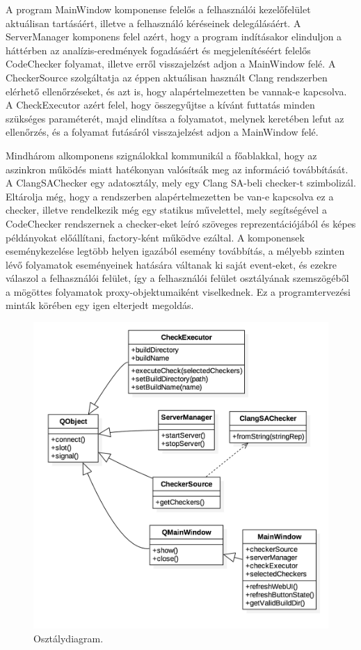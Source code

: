\documentclass[a4paper,12pt]{report}
\begin{document}
A program MainWindow komponense felelős a felhasználói kezelőfelület aktuálisan tartásáért, illetve a felhasználó kéréseinek delegálásáért. A ServerManager komponens felel azért, hogy a program indításakor elinduljon a háttérben az analízis-eredmények fogadásáért és megjelenítéséért felelős CodeChecker folyamat, illetve erről visszajelzést adjon a MainWindow felé. A CheckerSource szolgáltatja az éppen aktuálisan használt Clang rendszerben elérhető ellenőrzéseket, és azt is, hogy alapértelmezetten be vannak-e kapcsolva. A CheckExecutor azért felel, hogy összegyűjtse a kívánt futtatás minden szükséges paraméterét, majd elindítsa a folyamatot, melynek keretében lefut az ellenőrzés, és a folyamat futásáról visszajelzést adjon a MainWindow felé.

Mindhárom alkomponens szignálokkal kommunikál a főablakkal, hogy az aszinkron működés miatt hatékonyan valósítsák meg az információ továbbítását. A ClangSAChecker egy adatosztály, mely egy Clang SA-beli checker-t szimbolizál. Eltárolja még, hogy a rendszerben alapértelmezetten be van-e kapcsolva ez a checker, illetve rendelkezik még egy statikus művelettel, mely segítségével a  CodeChecker rendszernek a checker-eket leíró szöveges reprezentációjából és képes példányokat előállítani, factory-ként működve ezáltal. A komponensek eseménykezelése legtöbb helyen igazából esemény továbbítás, a mélyebb szinten lévő folyamatok eseményeinek hatására váltanak ki saját event-eket, és ezekre válaszol a felhasználói felület, így a felhasználói felület osztályának szemszögéből a mögöttes folyamatok proxy-objektumaiként viselkednek. Ez a programtervezési minták körében egy igen elterjedt megoldás.

\begin{figure}[h]
\caption{Osztálydiagram.}
\centering
\includegraphics[scale=0.3]{osztalydiagram.png}
\end{figure}
\end{document}
